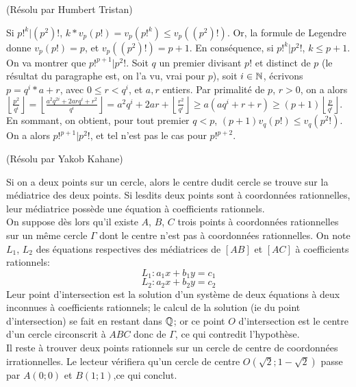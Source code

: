 \begin{sol}[64](R\'esolu par Humbert Tristan)

		Si $p!^k | (p^2)!$, $k*v_p(p!) = v_p(p!^k) \leq v_p((p^2)!)$. 
		Or, la formule de Legendre donne $v_p(p!)=p$, et $v_p((p^2)!)=p+1$. En cons\'equence, si $p!^k | p^2!$, $k \leq p+1$. \\
		On va montrer que $p!^{p+1} | p^2!$. Soit $q$ un premier divisant $p!$ et distinct de $p$ (le r\'esultat du paragraphe est, on l'a vu, vrai pour $p$), soit $i \in \mathbb{N}$, \'ecrivons $p=q^i*a+r$, avec $0 \leq r < q^i$, et $a,r$ entiers. Par primalit\'e de $p$, $r > 0$, on a alors \\ $\left\lfloor \frac{p^2}{q^i}\right\rfloor = \left\lfloor \frac{a^2q^{2i}+2arq^i+r^2}{q^i}\right\rfloor=a^2q^i+2ar+\left\lfloor \frac{r^2}{q^i}\right\rfloor \geq a(aq^i+r+r) \geq (p+1) \left\lfloor \frac{p}{q^i}\right\rfloor$. En sommant, on obtient, pour tout premier $q < p$, $(p+1)v_q(p!) \leq v_q(p^2!)$. \\
		On a alors $p!^{p+1} | p^2!$, et tel n'est pas le cas pour $p!^{p+2}$. 
\end{sol}

\begin{sol}[133](Résolu par Yakob Kahane)

		Si on a deux points sur un cercle, alors le centre dudit cercle se trouve sur la m\'ediatrice des deux points. Si lesdits deux points sont \`a coordonn\'ees rationnelles, leur m\'ediatrice poss\`ede une \'equation \`a coefficients rationnels. \\
			On suppose d\`es lors qu'il existe $A$, $B$, $C$ trois points \`a coordonn\'ees rationnelles sur un m\^eme cercle $\Gamma$ dont le centre n'est pas \`a coordonn\'ees rationnelles. On note $L_1$, $L_2$ des \'equations respectives des m\'ediatrices de $[AB]$ et $[AC]$ \`a coefficients rationnels:
			\[L_1: a_1x+b_1y=c_1\]
			\[L_2: a_2x+b_2y=c_2\]
			Leur point d'intersection est la solution d'un syst\`eme de deux \'equations \`a deux inconnues \`a coefficients rationnels; le calcul de la solution (ie du point d'intersection) se fait en restant dans $\mathbb Q$; or ce point $O$ d'intersection est le centre d'un cercle circonscrit \`a $ABC$ donc de $\Gamma$, ce qui contredit l'hypoth\`ese. \\
			Il reste \`a trouver deux points rationnels sur un cercle de centre de coordonn\'ees irrationnelles. Le lecteur v\'erifiera qu'un cercle de centre $O(\sqrt{2};1-\sqrt{2})$ passe par $A(0;0)$ et $B(1;1)$,ce qui conclut.  
\end{sol}

